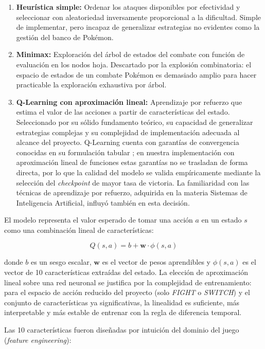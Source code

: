\begin{enumerate}
    \item \textbf{Heurística simple:} Ordenar los ataques disponibles por efectividad y seleccionar con aleatoriedad inversamente proporcional a la dificultad. Simple de implementar, pero incapaz de generalizar estrategias no evidentes como la gestión del banco de Pokémon.
    \item \textbf{Minimax:} Exploración del árbol de estados del combate con función de evaluación en los nodos hoja. Descartado por la explosión combinatoria: el espacio de estados de un combate Pokémon es demasiado amplio para hacer practicable la exploración exhaustiva por árbol.
    \item \textbf{Q-Learning con aproximación lineal:} Aprendizaje por refuerzo que estima el valor de las acciones a partir de características del estado. Seleccionado por su sólido fundamento teórico, su capacidad de generalizar estrategias complejas y su complejidad de implementación adecuada al alcance del proyecto. Q-Learning cuenta con garantías de convergencia conocidas en su formulación tabular \cite{watkins1992}; en nuestra implementación con aproximación lineal de funciones estas garantías no se trasladan de forma directa, por lo que la calidad del modelo se valida empíricamente mediante la selección del \textit{checkpoint} de mayor tasa de victoria. La familiaridad con las técnicas de aprendizaje por refuerzo, adquirida en la materia Sistemas de Inteligencia Artificial, influyó también en esta decisión.
\end{enumerate}

El modelo representa el valor esperado de tomar una acción $a$ en un estado $s$ como una combinación lineal de características:

\[ Q(s, a) = b + \mathbf{w} \cdot \phi(s, a) \]

donde $b$ es un sesgo escalar, $\mathbf{w}$ es el vector de pesos aprendibles y $\phi(s,a)$ es el vector de 10 características extraídas del estado. La elección de aproximación lineal sobre una red neuronal se justifica por la complejidad de entrenamiento: para el espacio de acción reducido del proyecto (solo \textit{FIGHT} o \textit{SWITCH}) y el conjunto de características ya significativas, la linealidad es suficiente, más interpretable y más estable de entrenar con la regla de diferencia temporal.

Las 10 características fueron diseñadas por intuición del dominio del juego (\textit{feature engineering}):

